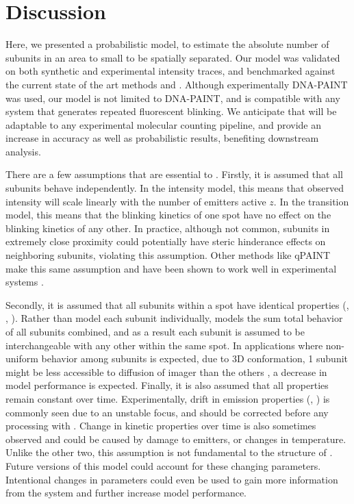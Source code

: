 \section{Discussion} \label{discussion}
Here, we presented \ours a probabilistic model, to estimate the absolute 
number of subunits in an area to small to be spatially separated. 
    Our model was validated on both synthetic and experimental intensity traces,
    and benchmarked against the current state of the art methods \lbfcs \cite{stein_2021} and \qpaint \cite{jungmann_2016}.
    Although experimentally DNA-PAINT was used, our model is not 
    limited to DNA-PAINT, and is compatible with any system that generates repeated fluorescent blinking.
    We anticipate that \ours will be adaptable to any experimental molecular counting pipeline,
    and provide an increase in accuracy as well as probabilistic results, benefiting downstream analysis.

There are a few assumptions that are essential to \ours.
    Firstly, it is assumed that all subunits behave independently.
    In the intensity model, this means that observed intensity will scale linearly with the number of emitters active $z$.
    In the transition model, this means that the blinking kinetics of one spot have no effect on the blinking kinetics of any other.
    In practice, although not common, subunits in extremely close proximity could potentially 
    have steric hinderance effects on neighboring subunits, violating this assumption.
    Other methods like qPAINT make this same assumption and have been shown to work well in experimental 
    systems \cite{fischer_quantitative_2021, jayasinghe_true_2018}. 
    
Secondly, it is assumed that all subunits within a spot have identical properties (\pon, \poff, \re).
    Rather than model each subunit individually, \ours models the sum total behavior of all subunits combined, 
    and as a result each subunit is assumed to be interchangeable with any other within the same spot.
    In applications where non-uniform behavior among subunits is expected, \eg due to 3D conformation, 
    1 subunit might be less accessible to diffusion of imager than the others \cite{civitci_2020}, a decrease in model performance is expected.
    Finally, it is also assumed that all properties remain constant over time. 
    Experimentally, drift in emission properties (\re, \rb) is commonly seen due to an unstable focus, and should be corrected before any processing with \ours.
    Change in kinetic properties over time is also sometimes observed and could be caused by damage to emitters, or changes in temperature. 
    Unlike the other two, this assumption is not fundamental to the structure of \ours. 
    Future versions of this model could account for these changing parameters.
    Intentional changes in parameters could even be used to gain more information from the system and further increase model performance. 
    

